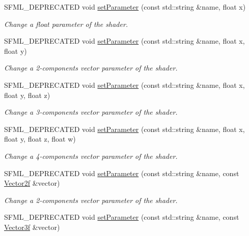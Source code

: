 \begin{DoxyCompactItemize}
S\+F\+M\+L\+\_\+\+D\+E\+P\+R\+E\+C\+A\+T\+ED void \mbox{\hyperlink{classsf_1_1_shader_a4d6ec78f6de1a0a2146c93ab09d7d762}{set\+Parameter}} (const std\+::string \&name, float x)
\begin{DoxyCompactList}\small\item\em Change a float parameter of the shader. \end{DoxyCompactList}\item 
S\+F\+M\+L\+\_\+\+D\+E\+P\+R\+E\+C\+A\+T\+ED void \mbox{\hyperlink{classsf_1_1_shader_a61f5cdb5847fc3b57335b095a2f3dad3}{set\+Parameter}} (const std\+::string \&name, float x, float y)
\begin{DoxyCompactList}\small\item\em Change a 2-\/components vector parameter of the shader. \end{DoxyCompactList}\item 
S\+F\+M\+L\+\_\+\+D\+E\+P\+R\+E\+C\+A\+T\+ED void \mbox{\hyperlink{classsf_1_1_shader_a1fa0fb11cabd8553ccd37e97c725c992}{set\+Parameter}} (const std\+::string \&name, float x, float y, float z)
\begin{DoxyCompactList}\small\item\em Change a 3-\/components vector parameter of the shader. \end{DoxyCompactList}\item 
S\+F\+M\+L\+\_\+\+D\+E\+P\+R\+E\+C\+A\+T\+ED void \mbox{\hyperlink{classsf_1_1_shader_a6d6b84575a5f1a869d70a126df8d6478}{set\+Parameter}} (const std\+::string \&name, float x, float y, float z, float w)
\begin{DoxyCompactList}\small\item\em Change a 4-\/components vector parameter of the shader. \end{DoxyCompactList}\item 
S\+F\+M\+L\+\_\+\+D\+E\+P\+R\+E\+C\+A\+T\+ED void \mbox{\hyperlink{classsf_1_1_shader_aee671dda9a84f607b9b780b2796def74}{set\+Parameter}} (const std\+::string \&name, const \mbox{\hyperlink{classsf_1_1_vector2}{Vector2f}} \&vector)
\begin{DoxyCompactList}\small\item\em Change a 2-\/components vector parameter of the shader. \end{DoxyCompactList}\item 
S\+F\+M\+L\+\_\+\+D\+E\+P\+R\+E\+C\+A\+T\+ED void \mbox{\hyperlink{classsf_1_1_shader_abf1eb5e74f216c7bcfaf34d08c960ee0}{set\+Parameter}} (const std\+::string \&name, const \mbox{\hyperlink{classsf_1_1_vector3}{Vector3f}} \&vector)

\end{DoxyCompactItemize}
